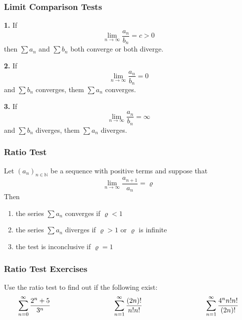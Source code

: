 \documentclass[xcolor=dvipsnames]{beamer}
\begin{document}
\begin{frame}
  \frametitle{Limit Comparison Tests}
  \textbf{1.} If
  \begin{equation}
    \label{eq:eaquaish}
    \lim_{n\rightarrow\infty}\frac{a_{n}}{b_{n}}=c>0
  \end{equation}
then $\sum{}a_{n}$ and $\sum{}b_{n}$ both converge or both
diverge.

\bigskip

  \textbf{2.} If
  \begin{equation}
    \label{eq:ejeixuaj}
    \lim_{n\rightarrow\infty}\frac{a_{n}}{b_{n}}=0
  \end{equation}
and $\sum{}b_{n}$ converges, them $\sum{}a_{n}$ converges.

\bigskip

  \textbf{3.} If
  \begin{equation}
    \label{eq:aeteiroh}
    \lim_{n\rightarrow\infty}\frac{a_{n}}{b_{n}}=\infty
  \end{equation}
and $\sum{}b_{n}$ diverges, them $\sum{}a_{n}$ diverges.
\end{frame}

\begin{frame}
  \frametitle{Ratio Test}
Let $\left(a_{n}\right)_{n\in\mathbb{N}}$ be a sequence with
positive terms and suppose that
\begin{equation}
  \label{eq:lahyaxee}
  \lim_{n\rightarrow\infty}\frac{a_{n+1}}{a_{n}}=\varrho
\end{equation}
Then
\begin{enumerate}
\item the series $\sum{}a_{n}$ converges if $\varrho<1$
\item the series $\sum{}a_{n}$ diverges if $\varrho>1$ or
  $\varrho$ is infinite
\item the test is inconclusive if $\varrho=1$
\end{enumerate}
\end{frame}

\begin{frame}
  \frametitle{Ratio Test Exercises}
  {\ubung} Use the ratio test to find out if the following exist:
  \begin{equation}
    \label{eq:uaxahphe}
    \begin{array}{ccccc}
      \displaystyle \sum_{n=0}^{\infty}\frac{2^{n}+5}{3^{n}} & \hspace{1in} & \displaystyle \sum_{n=1}^{\infty}\frac{(2n)!}{n!n!} & \hspace{1in} & \displaystyle \sum_{n=1}^{\infty}\frac{4^{n}n!n!}{(2n)!} \\
    \end{array}\notag
  \end{equation}
\end{frame}
\end{document}
